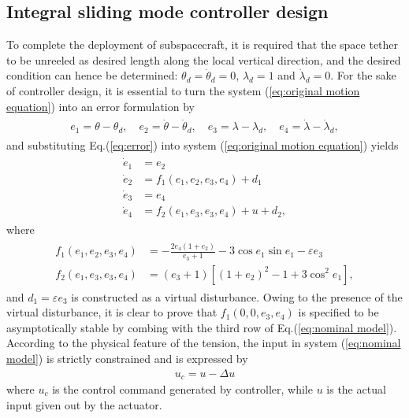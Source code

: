 \documentclass[ShortAfour]{sage}
\theoremstyle{plain}
\theoremstyle{remark}
\begin{document}
\subsection{Integral sliding mode controller design}
To complete the deployment of subspacecraft, it is required that the space tether to be unreeled as desired length along the local vertical direction, and the desired condition can hence be determined: $\theta_d=\dot\theta_d=0$, $\lambda_d=1$ and $\dot\lambda_d=0$. For the sake of controller design, it is essential to turn the system (\ref{eq:original motion equation}) into an error formulation by
\begin{align}\begin{split}
  e_1 = \theta - \theta_d,\quad e_2 = \dot\theta-\dot\theta_d,\quad
  e_3 = \lambda - \lambda_d,\quad e_4 = \dot\lambda-\dot\lambda_d,\label{eq:error}
\end{split}\end{align}
and substituting Eq.(\ref{eq:error}) into system (\ref{eq:original motion equation}) yields
\begin{align}\begin{split}
  \dot e_1 &= e_2\\
  \dot e_2 &= f_1(e_1,e_2,e_3,e_4)+d_1\\
  \dot e_3 &= e_4\\
  \dot e_4 &= f_2(e_1,e_3,e_3,e_4)+u+d_2\label{eq:nominal model},
\end{split}\end{align}
where
\begin{align}\begin{split}
  f_1(e_1,e_2,e_3,e_4) &= -\frac{2e_4(1+e_2)}{e_3+1}-3\cos e_1\sin e_1-\varepsilon e_3\\
  f_2(e_1,e_3,e_3,e_4) &= (e_3+1)\left[(1+e_2)^2-1+3\cos^2 e_1\right],
\end{split}\end{align}
and $d_1=\varepsilon e_3$ is constructed as a virtual disturbance. Owing to the presence of the virtual disturbance, it is clear to prove that $f_1(0,0,e_3,e_4)$ is specified to be asymptotically stable by combing with the third row of Eq.(\ref{eq:nominal model}). According to the physical feature of the tension, the input in system (\ref{eq:nominal model}) is strictly constrained and is expressed by
\begin{align}
  u_c = u - \Delta u\label{eq:delta u}
\end{align}
where $u_c$ is the control command generated by controller, while $u$ is the actual input given out by the actuator.
\end{document}
